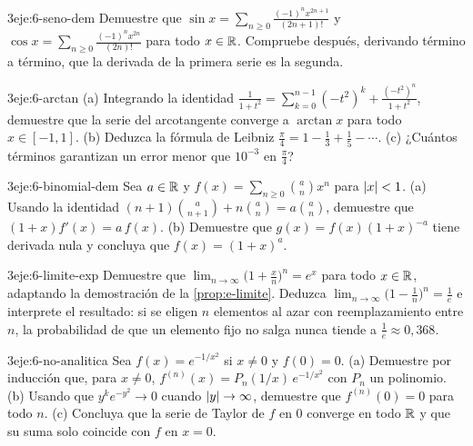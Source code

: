\begin{ejercicio}{3}{eje:6-seno-dem}
Demuestre que $\sin x=\sum_{n\ge0}\frac{(-1)^{n}x^{2n+1}}{(2n+1)!}$ y $\cos x=\sum_{n\ge0}\frac{(-1)^{n}x^{2n}}{(2n)!}$ para todo $x\in\mathbb{R}$. Compruebe después, derivando término a término, que la derivada de la primera serie es la segunda.
\end{ejercicio}

\begin{ejercicio}{3}{eje:6-arctan}
(a) Integrando la identidad $\frac{1}{1+t^{2}}=\sum_{k=0}^{n-1}(-t^{2})^{k}+\frac{(-t^{2})^{n}}{1+t^{2}}$, demuestre que la serie del arcotangente converge a $\arctan x$ para todo $x\in[-1,1]$. (b) Deduzca la fórmula de Leibniz $\frac\pi4=1-\frac13+\frac15-\cdots$. (c) ¿Cuántos términos garantizan un error menor que $10^{-3}$ en $\frac\pi4$?
\end{ejercicio}

\begin{ejercicio}{3}{eje:6-binomial-dem}
Sea $a\in\mathbb{R}$ y $f(x)=\sum_{n\ge0}\binom{a}{n}x^{n}$ para $\lvert x\rvert<1$. (a) Usando la identidad $(n+1)\binom{a}{n+1}+n\binom{a}{n}=a\binom{a}{n}$, demuestre que $(1+x)f'(x)=a\,f(x)$. (b) Demuestre que $g(x)=f(x)(1+x)^{-a}$ tiene derivada nula y concluya que $f(x)=(1+x)^{a}$.
\end{ejercicio}

\begin{ejercicio}{3}{eje:6-limite-exp}
Demuestre que $\lim_{n\to\infty}\bigl(1+\frac xn\bigr)^{n}=e^{x}$ para todo $x\in\mathbb{R}$, adaptando la demostración de la \cref{prop:e-limite}. Deduzca $\lim_{n\to\infty}\bigl(1-\frac1n\bigr)^{n}=\frac1e$ e interprete el resultado: si se eligen $n$ elementos al azar con reemplazamiento entre $n$, la probabilidad de que un elemento fijo no salga nunca tiende a $\frac1e\approx0{,}368$.
\end{ejercicio}

\begin{ejercicio}{3}{eje:6-no-analitica}
Sea $f(x)=e^{-1/x^{2}}$ si $x\neq0$ y $f(0)=0$. (a) Demuestre por inducción que, para $x\neq0$, $f^{(n)}(x)=P_n(1/x)\,e^{-1/x^{2}}$ con $P_n$ un polinomio. (b) Usando que $y^{k}e^{-y^{2}}\to0$ cuando $\lvert y\rvert\to\infty$, demuestre que $f^{(n)}(0)=0$ para todo $n$. (c) Concluya que la serie de Taylor de $f$ en $0$ converge en todo $\mathbb{R}$ y que su suma solo coincide con $f$ en $x=0$.
\end{ejercicio}
